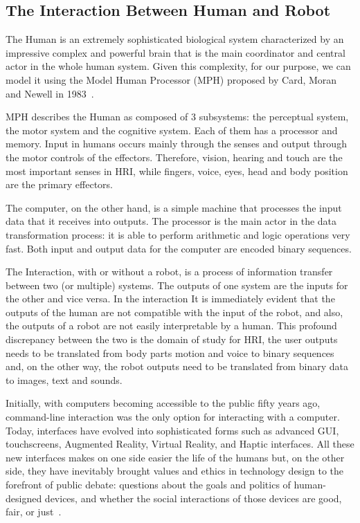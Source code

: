 \subsection{The Interaction Between Human and Robot}\label{subsec:the_interaction}
The Human is an extremely sophisticated biological system characterized by an impressive complex and powerful brain that is the main
coordinator and central actor in the whole human system. Given this complexity, for our purpose, we can model it using
the Model Human Processor (MPH) proposed by Card, Moran and Newell in 1983~\cite{card1986model}. 

MPH describes the Human as composed of 3 subsystems: the perceptual system, the motor system and the cognitive system. 
Each of them has a processor and memory.
Input in humans occurs mainly through the senses and output through the motor controls of the effectors\cite{dix2010human}. 
Therefore, vision, hearing and touch are the most important senses in HRI, while fingers, voice, eyes, 
head and body position are the primary effectors.

The computer, on the other hand, is a simple machine that processes the input data that it receives into outputs. 
The processor is the main actor in the data transformation process: it is able to perform arithmetic and logic operations very fast. 
Both input and output data for the computer are encoded binary sequences.

The Interaction, with or without a robot, is a process of information transfer between two (or multiple) systems. 
The outputs of one system are the inputs for the other and vice versa. 
In the interaction It is immediately evident that the outputs of the human are not compatible with the
input of the robot, and also, the outputs of a robot are not easily interpretable by a human. 
This profound discrepancy between the two is the domain of study for HRI, the user outputs needs to be translated from body parts 
motion and voice to binary sequences and, on the other way, the robot outputs need to be translated from binary data to images, text and sounds.

Initially, with computers becoming accessible to the public fifty years ago, command-line interaction was the only option for interacting with a computer. 
Today, interfaces have evolved into sophisticated forms such as advanced GUI, touchscreens, Augmented Reality, Virtual Reality, and Haptic interfaces. 
All these new interfaces makes on one side easier the life of the humans but, on the other side, they have inevitably brought values 
and ethics in technology design to the forefront of public debate: questions about the goals and politics of human-designed devices, 
and whether the social interactions of those devices are good, fair, or just~\cite{shilton2018hciEthics}. 

